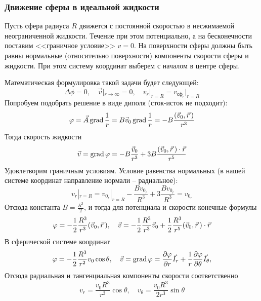 \subsubsection{Движение сферы в идеальной жидкости}
Пусть сфера радиуса $R$ движется с постоянной скоростью в несжимаемой 
неограниченной жидкости. Течение при этом потенциально, а на бесконечности поставим <<граничное условие>> $v=0$. На поверхности сферы должны быть равны нормальные (относительно поверхности) компоненты скорости сферы и жидкости. При этом систему координат выберем с началом в центре сферы. 

Математическая формулировка такой задачи будет следующей:
\begin{equation}
    \Delta \phi = 0, \quad
    \vec{v} |_{r\to \infty}=0, \quad
    v_r |_{r=R}=v_{\text{сф}_r}|_{r=R}
\end{equation}
Попробуем подобрать решение в виде диполя (сток-исток не подходит):
\begin{equation}
    \varphi = \vec{A} \operatorname{grad} \frac{1}{r} = B \vec{v}_0 \operatorname{grad} \frac{1}{r}=
    -B \frac{\qty(\vec{v}_0,\vec{r}\,)}{r^3}
\end{equation}
Тогда скорость жидкости
\begin{equation}
    \vec{v} = \operatorname{grad} \varphi = -B \frac{\vec{v}_0}{r^3} +
    3B \frac{(\vec{v}_0,\vec{r}\,)\cdot \vec{r}}{r^5}
\end{equation}
Удовлетворим граничным условиям. Условие равенства нормальных (в нашей системе координат направление нормали -- радиальное):
\begin{equation}
    v_r |_{r=R}= v_{0_r}|_{r=R}
    -\frac{B{v_{0_r}}}{R^3}
    +3\frac{B v_{0_r}}{R^3} = v_{0_r} 
\end{equation}
Отсюда константа $B=\frac{R^3}{2}$, и тогда для потенциала и скорости конечные формулы
\begin{equation}
    \varphi = -\frac{1}{2} \frac{R^3}{r^3} \qty(\vec{v}_0,\vec{r}\,), \quad
    \vec{v} = -\frac{1}{2} \frac{R^3}{r^3} \vec{v}_0
    +\frac{1}{2} \frac{R^3}{r^5} (\vec{v}_0,\vec{r}\,)\cdot \vec{r}
\end{equation}
В сферической системе координат
\begin{equation}
    \varphi = -\frac{1}{2} \frac{R^3}{r^2} v_0 \cos\theta, \quad
    \vec{v} = \operatorname{grad}\varphi = \pdv{\varphi}{r} \vec{I}_r +
    \frac{1}{r} \pdv{\varphi}{\theta} \vec{I}_\theta,
\end{equation}
Отсюда радиальная и тангенциальная компоненты скорости соответственно
\begin{equation}
    v_r= \frac{v_0 R^3}{r^3}\cos\theta, \quad
    v_\theta = \frac{v_0 R^3}{2r^3} \sin\theta
\end{equation}

